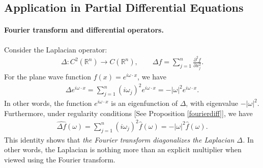 \documentclass{article}
\numberwithin{equation}{section}
\newcommand{\bbR}{\mathbb{R}}
\newcommand{\wh}{\widehat}
\theoremstyle{plain}
\theoremstyle{definition}
\begin{document}
\newpage
\subsection{Application in Partial Differential Equations}
\paragraph{Fourier transform and differential operators.} Consider the Laplacian operator:
\begin{align*}
	\Delta:C^2(\bbR^n)\to C(\bbR^n),\qquad \Delta f=\sum_{j=1}^n\frac{\partial^2 f}{\partial x_j^2}.
\end{align*}
For the plane wave function $f(x)=e^{i\omega\cdot x}$, we have
\begin{align*}
	\Delta e^{i\omega\cdot x}=\sum_{j=1}^n(i\omega_j)^2e^{i\omega\cdot x}=-\vert\omega\vert^2e^{i\omega\cdot x}.
\end{align*}
In other words, the function $e^{i\omega\cdot x}$ is an eigenfunction of $\Delta$, with eigenvalue $-\vert\omega\vert^2$. Furthermore, under regularity conditions [See Proposition \ref{fourierdiff}], we have
\begin{align*}
	\wh{\Delta f}(\omega)=\sum_{j=1}^n(i\omega_j)^2\wh{f}(\omega)=-\vert\omega\vert^2\wh{f}(\omega).
\end{align*}
This identity shows that \textit{the Fourier transform diagonalizes the Laplacian $\Delta$.} In other words, the Laplacian is nothing more than an explicit multiplier when viewed using the Fourier transform.
\end{document}
